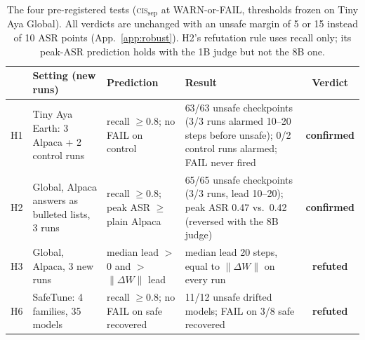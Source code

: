 \documentclass[11pt]{article}
\newcommand{\cissep}{\textsc{cis}$_{\text{sep}}$}
\newcommand{\dw}{$\lVert\Delta W\rVert$}
\begin{document}
\begin{table}[t]
\centering\small
\begin{tabular}{@{}l p{3.4cm} p{3.4cm} p{5.7cm} c@{}}
\toprule
& Setting (new runs) & Prediction & Result & Verdict \\
\midrule
H1 & Tiny Aya Earth: 3 Alpaca + 2 control runs & recall $\ge$0.8; no FAIL on control
   & 63/63 unsafe checkpoints (3/3 runs alarmed 10--20 steps before unsafe); 0/2 control runs alarmed; FAIL never fired
   & \textbf{confirmed} \\
H2 & Global, Alpaca answers as bulleted lists, 3 runs & recall $\ge$0.8; peak ASR $\ge$ plain Alpaca
   & 65/65 unsafe checkpoints (3/3 runs, lead 10--20); peak ASR 0.47 vs.\ 0.42 (reversed with the 8B judge) & \textbf{confirmed} \\
H3 & Global, Alpaca, 3 new runs & median lead $>$0 and $>$ \dw{} lead
   & median lead 20 steps, equal to \dw{} on every run & \textbf{refuted} \\
H6 & SafeTune: 4 families, 35 models & recall $\ge$0.8; no FAIL on safe recovered
   & 11/12 unsafe drifted models; FAIL on 3/8 safe recovered & \textbf{refuted} \\
\bottomrule
\end{tabular}
\caption{The four pre-registered tests (\cissep{} at WARN-or-FAIL, thresholds frozen on Tiny Aya Global). All verdicts
are unchanged with an unsafe margin of 5 or 15 instead of 10 ASR points (App.~\ref{app:robust}). H2's refutation rule
uses recall only; its peak-ASR prediction holds with the 1B judge but not the 8B one.}
\label{tab:prereg}
\end{table}
\end{document}
